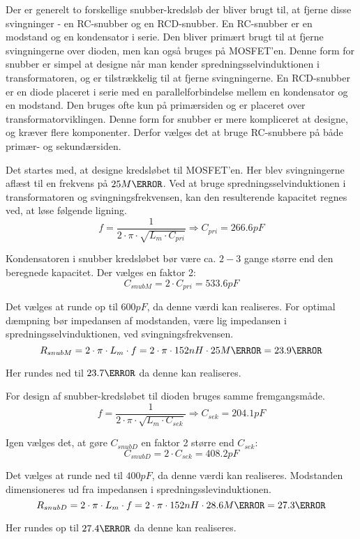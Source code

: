 Der er generelt to forskellige snubber-kredsløb der bliver brugt til, at fjerne disse svingninger - en RC-snubber og en RCD-snubber\cite{snubber_design}. En RC-snubber er en modstand og en kondensator i serie. Den bliver primært brugt til at fjerne svingningerne over dioden, men kan også bruges på MOSFET'en. Denne form for snubber er simpel at designe når man kender spredningsselvinduktionen i transformatoren, og er tilstrækkelig til at fjerne svingningerne. En RCD-snubber er en diode placeret i serie med en parallelforbindelse mellem en kondensator og en modstand. Den bruges ofte kun på primærsiden og er placeret over transformatorviklingen. Denne form for snubber er mere kompliceret at designe, og kræver flere komponenter. Derfor vælges det at bruge RC-snubbere på både primær- og sekundærsiden.

Det startes med, at designe kredsløbet til MOSFET'en. Her blev svingningerne aflæst til en frekvens på $25M\hertz$. Ved at bruge spredningsselvinduktionen i transformatoren og svingningsfrekvensen, kan den resulterende kapacitet regnes ved, at løse følgende ligning.
\begin{equation} \label{eq:MOSFET_snubber}
f = \frac{1}{2 \cdot \pi \cdot \sqrt{L_{m} \cdot C_{pri}}} \Rightarrow C_{pri}=266.6pF
\end{equation}

Kondensatoren i snubber kredsløbet bør være ca. $2-3$ gange større end den beregnede kapacitet\cite{snubber_design}. Der vælges en faktor 2:
\begin{equation}
C_{snubM} = 2 \cdot C_{pri} = 533.6pF
\end{equation}

\noindent Det vælges at runde op til $600pF$, da denne værdi kan realiseres. For optimal dæmpning bør impedansen af modstanden, være lig impedansen i spredningsselvinduktionen, ved svingningsfrekvensen. 
\begin{equation}
R_{snubM} = 2 \cdot \pi \cdot L_m \cdot f = 2 \cdot \pi \cdot 152nH \cdot 25M\hertz = 23.9\ohm
\end{equation}

\noindent Her rundes ned til $23.7\ohm$ da denne kan realiseres. 

\noindent For design af snubber-kredsløbet til dioden bruges samme fremgangsmåde.
\begin{equation} \label{eq:diode_snubber}
f = \frac{1}{2 \cdot \pi \cdot \sqrt{L_{m} \cdot C_{sek}}} \Rightarrow C_{sek}=204.1pF
\end{equation}

Igen vælges det, at gøre $C_{snubD}$ en faktor 2 større end $C_{sek}$:
\begin{equation}
C_{snubD} = 2 \cdot C_{sek} = 408.2pF
\end{equation}

\noindent Det vælges at runde ned til $400pF$, da denne værdi kan realiseres. Modstanden dimensioneres ud fra impedansen i spredningsslevinduktionen. 
\begin{equation}
R_{snubD} = 2 \cdot \pi \cdot L_m \cdot f = 2 \cdot \pi \cdot 152nH \cdot 28.6M\hertz = 27.3\ohm
\end{equation}

\noindent Her rundes op til $27.4\ohm$ da denne kan realiseres.


